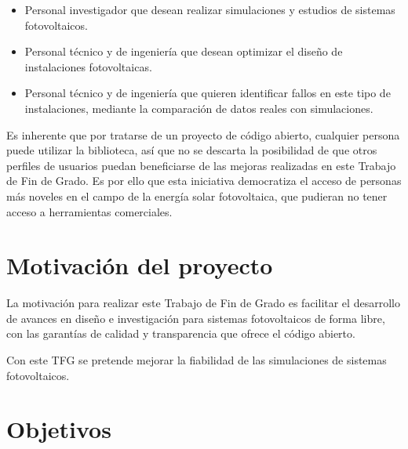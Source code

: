 \begin{itemize}

    \item Personal investigador que desean realizar simulaciones y estudios de sistemas fotovoltaicos.

    \item Personal técnico y de ingeniería que desean optimizar el diseño de instalaciones fotovoltaicas.

    \item Personal técnico y de ingeniería que quieren identificar fallos en este tipo de instalaciones, mediante la comparación de datos reales con simulaciones.

\end{itemize}

Es inherente que por tratarse de un proyecto de código abierto, cualquier persona puede utilizar la biblioteca, así que no se descarta la posibilidad de que otros perfiles de usuarios puedan beneficiarse de las mejoras realizadas en este Trabajo de Fin de Grado. Es por ello que esta iniciativa democratiza el acceso de personas más noveles en el campo de la energía solar fotovoltaica, que pudieran no tener acceso a herramientas comerciales.


\section{Motivación del proyecto} \label{sct:intro:motivacion}

La motivación para realizar este Trabajo de Fin de Grado es facilitar el desarrollo de avances en diseño e investigación para sistemas fotovoltaicos de forma libre, con las garantías de calidad y transparencia que ofrece el código abierto.

Con este TFG se pretende mejorar la fiabilidad de las simulaciones de sistemas fotovoltaicos.


\section{Objetivos} \label{sct:intro:objetivos}

